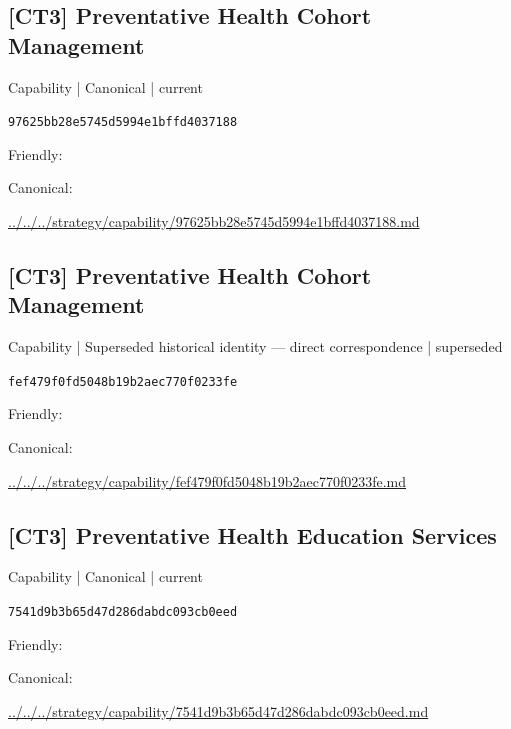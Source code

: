 \documentclass[10pt,a4paper]{article}
\begin{document}
\subsection*{[CT3] Preventative Health Cohort Management}
{\small Capability | Canonical | current}\par
\texttt{97625bb28e5745d5994e1bffd4037188}\par
Friendly: \par
Canonical: \par
{\footnotesize\url{../../../strategy/capability/97625bb28e5745d5994e1bffd4037188.md}}\par
\subsection*{[CT3] Preventative Health Cohort Management}
{\small Capability | Superseded historical identity — direct correspondence | superseded}\par
\texttt{fef479f0fd5048b19b2aec770f0233fe}\par
Friendly: \par
Canonical: \par
{\footnotesize\url{../../../strategy/capability/fef479f0fd5048b19b2aec770f0233fe.md}}\par
\subsection*{[CT3] Preventative Health Education Services}
{\small Capability | Canonical | current}\par
\texttt{7541d9b3b65d47d286dabdc093cb0eed}\par
Friendly: \par
Canonical: \par
{\footnotesize\url{../../../strategy/capability/7541d9b3b65d47d286dabdc093cb0eed.md}}\par
\end{document}
